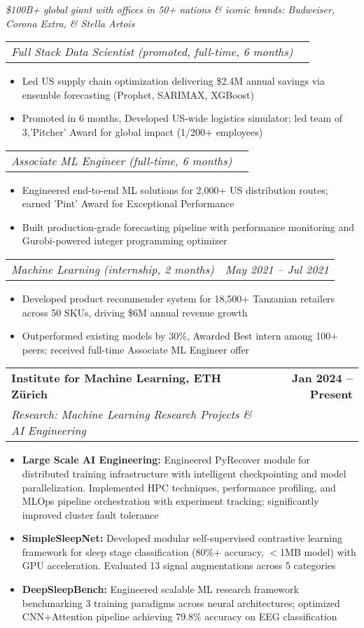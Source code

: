 \documentclass[letterpaper,10pt]{article}
\makeatletter
\newcommand{\resumeItem}[1]{
  \item\small{
    {#1 \vspace{-2pt}}
  }
}
\newcommand{\resumeSubheading}[4]{
  \vspace{-2pt}\item
    \begin{tabular*}{1.0\textwidth}[t]{l@{\extracolsep{\fill}}r}
      \textbf{#1} & \textbf{\small #2} \\
      \textcolor{accentblue}{\textit{\small#3}} & \textit{\small #4} \\
    \end{tabular*}\vspace{-7pt}
}
\newcommand{\resumeSubSubheading}[2]{
    \item
    \begin{tabular*}{0.97\textwidth}{l@{\extracolsep{\fill}}r}
      \textcolor{accentblue}{\textit{\small#1}} & \textcolor{accentblue}{\textit{\small #2}} \\
    \end{tabular*}\vspace{-7pt}
}
\newcommand{\resumeItemListStart}{\begin{itemize}}
\newcommand{\resumeItemListEnd}{\end{itemize}\vspace{-5pt}}
\makeatother
\begin{document}
      {\small\textit{\$100B+ global giant with offices in 50+ nations \& iconic brands: Budweiser, Corona Extra, \& Stella Artois}}

      \vspace{-5 pt}
      
      \resumeSubSubheading{\textcolor{accentblue}{Full Stack Data Scientist (promoted, full-time, 6 months)}}{}
      \resumeItemListStart
        \resumeItem{Led US supply chain optimization delivering \$2.4M annual savings via ensemble forecasting (Prophet, SARIMAX, XGBoost)}
        \resumeItem{Promoted in 6 months, Developed US-wide logistics simulator; led team of 3,'Pitcher' Award for global impact (1/200+ employees)}
      \resumeItemListEnd

      \resumeSubSubheading{\textcolor{accentblue}{Associate ML Engineer (full-time, 6 months)}}{}
      \resumeItemListStart
        \resumeItem{Engineered end-to-end ML solutions for 2,000+ US distribution routes; earned 'Pint' Award for Exceptional Performance}
        \resumeItem{Built production-grade forecasting pipeline with performance monitoring and Gurobi-powered integer programming optimizer}
      \resumeItemListEnd

      \resumeSubSubheading{\textcolor{accentblue}{Machine Learning (internship, 2 months)}}{May 2021 -- Jul 2021}
      \resumeItemListStart          
        \resumeItem{Developed product recommender system for 18,500+ Tanzanian retailers across 50 SKUs, driving \$6M annual revenue growth}
        \resumeItem{Outperformed existing models by 30\%, Awarded Best intern among 100+ peers; received full-time Associate ML Engineer offer}
      \resumeItemListEnd

        \resumeSubheading
      {Institute for Machine Learning, ETH Zürich}{Jan 2024 -- Present}
      {Research: Machine Learning Research Projects \& AI Engineering}{}
            \resumeItemListStart
                \resumeItem{\textbf{Large Scale AI Engineering:} Engineered PyRecover module for distributed training infrastructure with intelligent checkpointing and model parallelization. Implemented HPC techniques, performance profiling, and MLOps pipeline orchestration with experiment tracking; significantly improved cluster fault tolerance}
                \resumeItem{\textbf{SimpleSleepNet:} Developed modular self-supervised contrastive learning framework for sleep stage classification (80\%+ accuracy, $<$1MB model) with GPU acceleration. Evaluated 13 signal augmentations across 5 categories}
                \resumeItem{\textbf{DeepSleepBench:} Engineered scalable ML research framework benchmarking 3 training paradigms across neural architectures; optimized CNN+Attention pipeline achieving 79.8\% accuracy on EEG classification}
            \resumeItemListEnd
\end{document}
